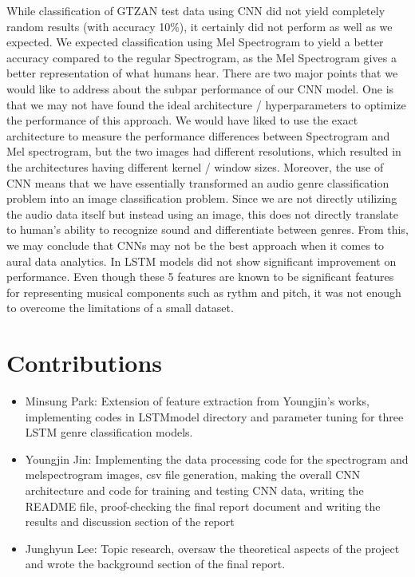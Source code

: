 \documentclass{article}
\theoremstyle{plain}
\theoremstyle{definition}
\theoremstyle{remark}
\begin{document}
While classification of GTZAN test data using CNN did not yield completely random results (with accuracy 10\%), it certainly did not perform as well as we expected. We expected classification using Mel Spectrogram to yield a better accuracy compared to the regular Spectrogram, as the Mel Spectrogram gives a better representation of what humans hear. There are two major points that we would like to address about the subpar performance of our CNN model. One is that we may not have found the ideal architecture / hyperparameters to optimize the performance of this approach. We would have liked to use the exact architecture to measure the performance differences between Spectrogram and Mel spectrogram, but the two images had different resolutions, which resulted in the architectures having different kernel / window sizes. Moreover, the use of CNN means that we have essentially transformed an audio genre classification problem into an image classification problem. Since we are not directly utilizing the audio data itself but instead using an image, this does not directly translate to human's ability to recognize sound and differentiate between genres. From this, we may conclude that CNNs may not be the best approach when it comes to aural data analytics.
In LSTM models did not show significant improvement on performance. Even though these 5 features are known to be significant features for representing musical components such as rythm and pitch, it was not enough to overcome the limitations of a small dataset.  



\section{Contributions}

\begin{itemize}
\item Minsung Park: Extension of feature extraction from Youngjin's works, implementing  codes in LSTMmodel directory and parameter tuning for three LSTM genre classification models.

\item Youngjin Jin: Implementing the data processing code for the spectrogram and melspectrogram images, csv file generation, making the overall CNN architecture and code for training and testing CNN data, writing the README file, proof-checking the final report document and writing the results and discussion section of the report

\item Junghyun Lee: Topic research, oversaw the theoretical aspects of the project and wrote the background section of the final report.

\end{itemize}
\end{document}
